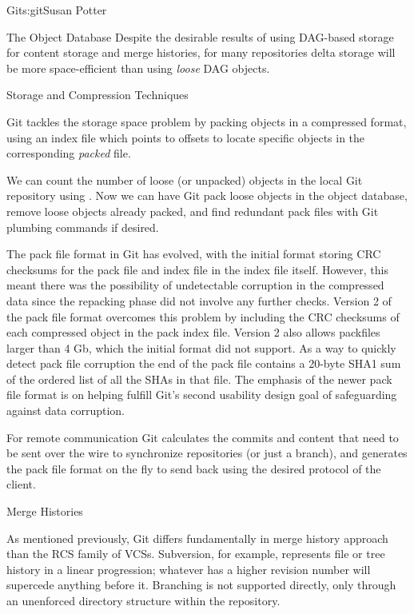 \begin{aosachapter}{Git}{s:git}{Susan Potter}
\begin{aosasect1}{The Object Database}
Despite the desirable results of using DAG-based storage for content
storage and merge histories, for many repositories delta storage will be
more space-efficient than using \emph{loose} DAG objects.

\end{aosasect1}

\begin{aosasect1}{Storage and Compression Techniques}

Git tackles the storage space problem by packing objects in a compressed
format, using an index file which points to offsets to locate specific objects in the
corresponding \emph{packed} file.


We can count the number of loose (or unpacked) objects in the local
Git repository using . Now we can have Git pack
loose objects in the object database, remove loose objects already
packed, and find redundant pack files with Git plumbing commands if desired.

The pack file format in Git has evolved, with the initial format storing
CRC checksums for the pack file and index file in the index file
itself. However, this meant there was the possibility of undetectable
corruption in the compressed data since the repacking phase did not involve any
further checks. Version 2 of the pack file format overcomes this problem by
including the CRC checksums of each compressed object in the pack index
file. Version 2 also allows packfiles larger than 4 Gb, which the initial
format did not support. As a way to quickly detect pack file corruption the
end of the pack file contains a 20-byte SHA1 sum of the ordered list of all
the SHAs in that file.  
The emphasis of the newer pack file format is on helping fulfill Git's second
usability design goal of safeguarding against data corruption.

For remote communication Git calculates the commits and content that need
to be sent over the wire to synchronize repositories (or just a branch), and
generates the pack file format on the fly to send back using the desired
protocol of the client.

\end{aosasect1}

\begin{aosasect1}{Merge Histories}

As mentioned previously, Git differs fundamentally in merge history approach
than the RCS family of VCSs. Subversion, for example, represents
file or tree history in a linear progression; whatever has a higher revision
number will supercede anything before it. Branching is not supported directly,
only through an unenforced directory structure within the repository.


\end{aosasect1}
\end{aosachapter}
